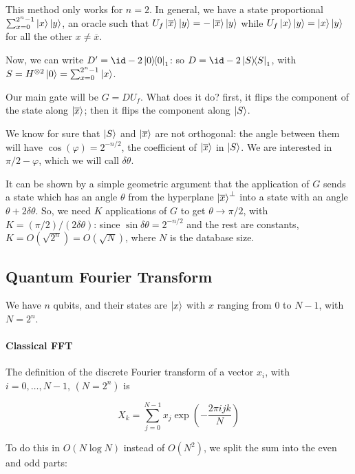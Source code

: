 \documentclass[main.tex]{subfiles}
\begin{document}
This method only works for \(n=2\). In general, we have a state proportional \(\sum _{x=0}^{2^n-1} \ket{x} \ket{y}\), an oracle such that \(U_f \ket{\overline{x} }\ket{y}  = -\ket{\overline{x} }\ket{y} \) while \(U_f \ket{x}\ket{y}= \ket{x} \ket{y}   \) for all the other \(x \neq \overline{x}\).

Now, we can write \(D' = \id - 2 \dyad{0}_1 \): so \(D = \id - 2 \dyad{S}_1 \), with \(S = H^{\otimes 2} \ket{0} = \sum _{x=0}^{2^n-1} \ket{x}\).

Our main gate will be \(G = D U_f\). What does it do? first, it flips the component of the state along \(\ket{\overline{x}} \); then it flips the component along \(\ket{S} \).

We know for sure that \(\ket{S} \) and \(\ket{\overline{x} } \) are not orthogonal: the angle between them will have \(\cos(\varphi) = 2^{-n/2}\), the coefficient of \(\ket{\overline{x} } \) in \(\ket{S} \). We are interested in \(\pi /2 - \varphi\), which we will call \(\delta \theta\).

It can be shown by a simple geometric argument that the application of \(G\) sends a state which has an angle \(\theta\) from  the hyperplane \(\ket{\overline{x} }^\perp \) into a state with an angle \(\theta + 2 \delta \theta\). So, we need \(K\) applications of \(G\) to get \(\theta \rightarrow \pi /2\), with \(K = (\pi/2)/(2 \delta \theta)\): since \(\sin\delta\theta = 2^{-n/2} \) and the rest are constants, \(K = O(\sqrt{2^n})=O(\sqrt{N})\), where \(N\) is the database size.

\subsection{Quantum Fourier Transform}

We have \(n\) qubits, and their states are \(\ket{x} \) with \(x\) ranging from 0 to \(N-1\), with \(N = 2^n\).

\paragraph{Classical FFT}

The definition of the  discrete Fourier transform of a vector \(x_i\), with \(i = 0, \dots, N-1 \), \((N = 2^n)\) is

\begin{equation}
    X_k = \sum _{j=0}   ^{N-1} x_j \exp(-\frac{2 \pi ijk}{N})
\end{equation}

To do this in \(O(N \log N)\) instead of \(O(N^2)\), we split the sum into the even and odd parts:
\end{document}
